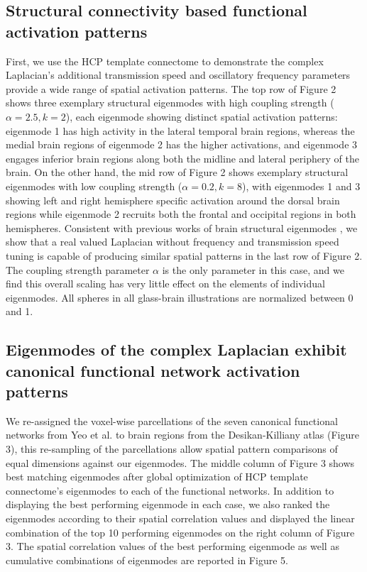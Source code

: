 \documentclass{article}
\begin{document}
\subsection{Structural connectivity based functional activation patterns}
First, we use the HCP template connectome to demonstrate the complex Laplacian's additional transmission speed and oscillatory frequency parameters provide a wide range of spatial activation patterns. The top row of Figure 2 shows three exemplary structural eigenmodes with high coupling strength ($\alpha = 2.5, k = 2$), each eigenmode showing distinct spatial activation patterns: eigenmode 1 has high activity in the lateral temporal brain regions, whereas the medial brain regions of eigenmode 2 has the higher activations, and eigenmode 3 engages inferior brain regions along both the midline and lateral periphery of the brain. On the other hand, the mid row of Figure 2 shows exemplary structural eigenmodes with low coupling strength ($\alpha = 0.2,k = 8$), with eigenmodes 1 and 3 showing left and right hemisphere specific activation around the dorsal brain regions while eigenmode 2 recruits both the frontal and occipital regions in both hemispheres. Consistent with previous works of brain structural eigenmodes \cite{Atasoy2016}, we show that a real valued Laplacian without frequency and transmission speed tuning is capable of producing similar spatial patterns in the last row of Figure 2. The coupling strength parameter $\alpha$ is the only parameter in this case, and we find this overall scaling has very little effect on the elements of individual eigenmodes. All spheres in all glass-brain illustrations are normalized between 0 and 1. 

\subsection{Eigenmodes of the complex Laplacian exhibit canonical functional network activation patterns}
We re-assigned the voxel-wise parcellations of the seven canonical functional networks from Yeo et al. \cite{Yeo2011} to brain regions from the Desikan-Killiany atlas (Figure 3), this re-sampling of the parcellations allow spatial pattern comparisons of equal dimensions against our eigenmodes. The middle column of Figure 3 shows best matching eigenmodes after global optimization of HCP template connectome's eigenmodes to each of the functional networks. In addition to displaying the best performing eigenmode in each case, we also ranked the eigenmodes according to their spatial correlation values and displayed the linear combination of the top 10 performing eigenmodes on the right column of Figure 3. The spatial correlation values of the best performing eigenmode as well as cumulative combinations of eigenmodes are reported in Figure 5.
\end{document}
